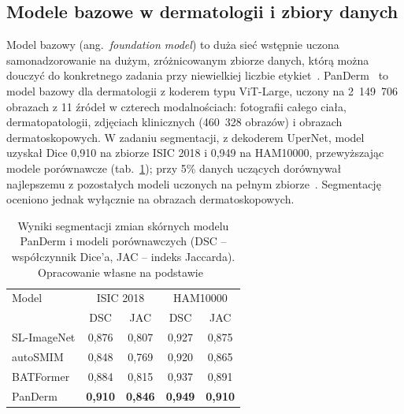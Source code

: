\subsection{Modele bazowe w dermatologii i zbiory danych}
\label{sec:modele-bazowe}

Model bazowy (ang.~\textit{foundation model}) to duża sieć wstępnie uczona samonadzorowanie na dużym, zróżnicowanym zbiorze danych, którą można douczyć do konkretnego zadania przy niewielkiej liczbie etykiet~\cite{yan2025panderm}. PanDerm~\cite{yan2025panderm} to model bazowy dla dermatologii z koderem typu ViT-Large, uczony na 2~149~706 obrazach z 11 źródeł w czterech modalnościach: fotografii całego ciała, dermatopatologii, zdjęciach klinicznych (460~328 obrazów) i obrazach dermatoskopowych. W zadaniu segmentacji, z dekoderem UperNet, model uzyskał Dice 0,910 na zbiorze ISIC 2018 i 0,949 na HAM10000, przewyższając modele porównawcze (tab.~\ref{tab:panderm}); przy 5\% danych uczących dorównywał najlepszemu z pozostałych modeli uczonych na pełnym zbiorze~\cite{yan2025panderm}. Segmentację oceniono jednak wyłącznie na obrazach dermatoskopowych.

\begin{table}[htbp]
  \centering
  \caption{Wyniki segmentacji zmian skórnych modelu PanDerm i modeli porównawczych (DSC -- współczynnik Dice'a, JAC -- indeks Jaccarda). Opracowanie własne na podstawie~\cite{yan2025panderm}}
  \label{tab:panderm}
  \begin{tabular}{lcccc}
    \toprule
    Model & \multicolumn{2}{c}{ISIC 2018} & \multicolumn{2}{c}{HAM10000} \\
     & DSC & JAC & DSC & JAC \\
    \midrule
    SL-ImageNet & 0,876 & 0,807 & 0,927 & 0,875 \\
    autoSMIM    & 0,848 & 0,769 & 0,920 & 0,865 \\
    BATFormer   & 0,884 & 0,815 & 0,937 & 0,891 \\
    PanDerm     & \textbf{0,910} & \textbf{0,846} & \textbf{0,949} & \textbf{0,910} \\
    \bottomrule
  \end{tabular}
\end{table}


